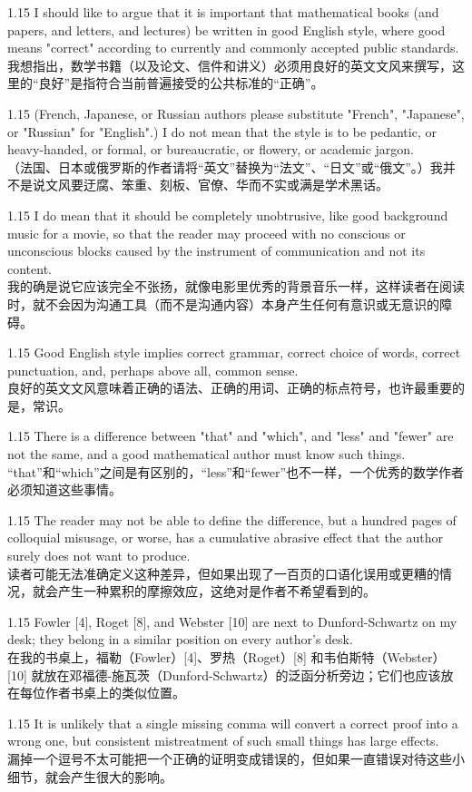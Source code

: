 \documentclass[12pt,a4paper]{article}
\newcommand{\bilingual}[2]{
    \begin{spacing}{1.15} %
        \noindent \normalsize #1 \\[-0.5ex] %
        \small \textcolor{blue!70!black}{#2} %
    \end{spacing}
    \vspace{0.8em} %
}
\begin{document}
\bilingual{I should like to argue that it is important that mathematical books (and papers, and letters, and lectures) be written in good English style, where good means "correct" according to currently and commonly accepted public standards.}
{我想指出，数学书籍（以及论文、信件和讲义）必须用良好的英文文风来撰写，这里的“良好”是指符合当前普遍接受的公共标准的“正确”。} %

\bilingual{(French, Japanese, or Russian authors please substitute "French", "Japanese", or "Russian" for "English".) I do not mean that the style is to be pedantic, or heavy-handed, or formal, or bureaucratic, or flowery, or academic jargon.}
{（法国、日本或俄罗斯的作者请将“英文”替换为“法文”、“日文”或“俄文”。）我并不是说文风要迂腐、笨重、刻板、官僚、华而不实或满是学术黑话。} %

\bilingual{I do mean that it should be completely unobtrusive, like good background music for a movie, so that the reader may proceed with no conscious or unconscious blocks caused by the instrument of communication and not its content.}
{我的确是说它应该完全不张扬，就像电影里优秀的背景音乐一样，这样读者在阅读时，就不会因为沟通工具（而不是沟通内容）本身产生任何有意识或无意识的障碍。} %

\bilingual{Good English style implies correct grammar, correct choice of words, correct punctuation, and, perhaps above all, common sense.}
{良好的英文文风意味着正确的语法、正确的用词、正确的标点符号，也许最重要的是，常识。} %

\bilingual{There is a difference between "that" and "which", and "less" and "fewer" are not the same, and a good mathematical author must know such things.}
{“that”和“which”之间是有区别的，“less”和“fewer”也不一样，一个优秀的数学作者必须知道这些事情。} %

\bilingual{The reader may not be able to define the difference, but a hundred pages of colloquial misusage, or worse, has a cumulative abrasive effect that the author surely does not want to produce.}
{读者可能无法准确定义这种差异，但如果出现了一百页的口语化误用或更糟的情况，就会产生一种累积的摩擦效应，这绝对是作者不希望看到的。} %

\bilingual{Fowler [4], Roget [8], and Webster [10] are next to Dunford-Schwartz on my desk; they belong in a similar position on every author's desk.}
{在我的书桌上，福勒（Fowler）[4]、罗热（Roget）[8] 和韦伯斯特（Webster）[10] 就放在邓福德-施瓦茨（Dunford-Schwartz）的泛函分析旁边；它们也应该放在每位作者书桌上的类似位置。} %

\bilingual{It is unlikely that a single missing comma will convert a correct proof into a wrong one, but consistent mistreatment of such small things has large effects.}
{漏掉一个逗号不太可能把一个正确的证明变成错误的，但如果一直错误对待这些小细节，就会产生很大的影响。} %
\end{document}

